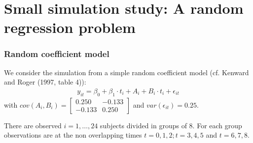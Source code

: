 \documentclass[compress]{beamer}\usepackage[]{graphicx}\usepackage[]{color}
\newenvironment{sframe}
{\begin{frame} [containsverbatim] }
  {\end{frame}}
\begin{document}
\section{Small simulation study: A random regression problem}
\begin{sframe}
  \frametitle{Random coefficient model}
We consider the simulation from  a simple random coefficient model
(cf. Kenward  and Roger (1997, table 4)):
\begin{gather*}
y_{it}= \beta_0 + \beta_1 \cdot t_i  + A_{i} + B_i \cdot t_i + \epsilon_{it}
\end{gather*}
with $cov(A_i,B_{i})=
\left[
\begin{array}{rr}
 0.250 & -0.133\\
-0.133 &  0.250
\end{array}
\right] $
and $var(\epsilon_{it})=0.25$.

There are observed $i=1,\dots,24$ subjects divided in groups of 8.
For each group observations are
at the non overlapping times $t=0, 1, 2; t=3, 4, 5$ and $t=6, 7, 8$.
\end{sframe}
\end{document}
